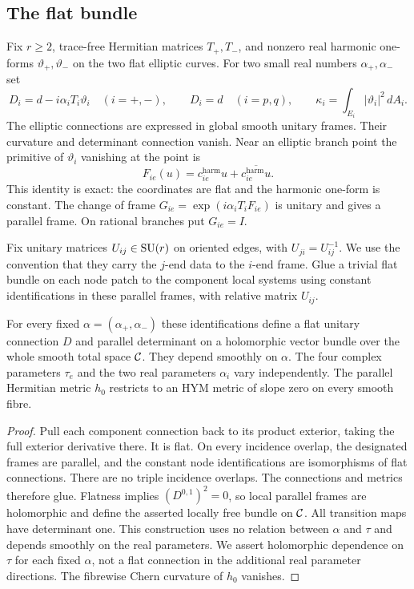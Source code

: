 \subsection{The flat bundle}
Fix $r\ge2$, trace-free Hermitian matrices $T_+,T_-$, and nonzero real
harmonic one-forms $\vartheta_+,\vartheta_-$ on the two flat elliptic
curves. For two small real numbers $\alpha_+,\alpha_-$ set
\begin{equation}\label{eq:component-connection}
 D_i=d-i\alpha_iT_i\vartheta_i\quad(i=+,-),
 \qquad D_i=d\quad(i=p,q),
 \qquad \kappa_i=\int_{E_i}|\vartheta_i|^2\,dA_i.
\end{equation}
The elliptic connections are expressed in global smooth unitary frames.
Their curvature and determinant connection vanish. Near an elliptic
branch point the primitive of $\vartheta_i$ vanishing at the point is
\begin{equation}\label{eq:primitive}
 F_{ie}(u)=c_{ie}^{\mathrm{harm}}u+
           \overline{c_{ie}^{\mathrm{harm}}u}.
\end{equation}
This identity is exact: the coordinates are flat and the harmonic
one-form is constant. The change of frame
$G_{ie}=\exp(i\alpha_iT_iF_{ie})$ is unitary and gives a parallel
frame. On rational branches put $G_{ie}=I$.

Fix unitary matrices $U_{ij}\in\operatorname{SU}(r)$ on oriented edges, with
$U_{ji}=U_{ij}^{-1}$. We use the convention that they carry the
$j$-end data to the $i$-end frame. Glue a trivial flat bundle on each
node patch to the component local systems using constant identifications
in these parallel frames, with relative matrix $U_{ij}$.

\begin{proposition}\label{prop:bundle-family}
For every fixed $\alpha=(\alpha_+,\alpha_-)$ these identifications
define a flat unitary connection $D$ and parallel determinant on a
holomorphic vector bundle over the whole smooth total space $\mathcal C$.
They depend smoothly on $\alpha$. The four complex parameters $\tau_e$
and the two real parameters $\alpha_i$ vary independently. The parallel
Hermitian metric $h_0$ restricts to an HYM metric of slope zero on every
smooth fibre.
\end{proposition}

\begin{proof}
Pull each component connection back to its product exterior, taking the
full exterior derivative there. It is flat. On every incidence overlap,
the designated frames are parallel, and the constant node
identifications are isomorphisms of flat connections. There are no
triple incidence overlaps. The connections and metrics therefore glue.
Flatness implies $(D^{0,1})^2=0$, so local parallel frames are
holomorphic and define the asserted locally free bundle on $\mathcal C$.
All transition maps have determinant one. This construction uses no
relation between $\alpha$ and $\tau$ and depends smoothly on the real
parameters. We assert holomorphic dependence on $\tau$ for each fixed
$\alpha$, not a flat connection in the additional real parameter
directions. The fibrewise Chern curvature of $h_0$ vanishes.
\end{proof}

